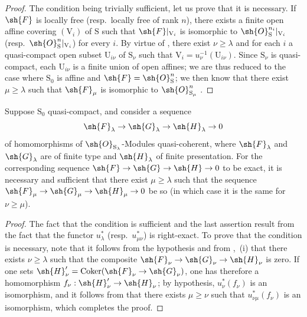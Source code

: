 \begin{proof}
The condition being trivially sufficient, let us prove that it is necessary.
If $\sh{F}$ is locally free (resp.\ locally free of rank $n$), there exists a finite open affine covering $(\mathrm{V}_i)$ of $\mathrm{S}$ such that $\sh{F}|_{\mathrm{V}_i}$ is isomorphic to $\sh{O}_\mathrm{S}^{n_i}|_{\mathrm{V}_i}$ (resp.\ $\sh{O}_\mathrm{S}^n|_{\mathrm{V}_i}$) for every $i$.
By virtue of , there exist $\nu\geqslant\lambda$ and for each $i$ a quasi-compact open subset $\mathrm{U}_{i\nu}$ of $\mathrm{S}_\nu$ such that $\mathrm{V}_i=u_\nu^{-1}(\mathrm{U}_{i\nu})$.
Since $\mathrm{S}_\nu$ is quasi-compact, each $\mathrm{U}_{i\nu}$ is a finite union of open affines; we are thus reduced to the case where $\mathrm{S}_0$ is affine and $\sh{F}=\sh{O}_\mathrm{S}^n$; we then know that there exist $\mu\geqslant\lambda$ such that $\sh{F}_\mu$ is isomorphic to $\sh{O}_{\mathrm{S}_\mu}^n$ .
\end{proof}

\begin{proposition}[8.5.6]
\label{IV.8.5.6}
Suppose $\mathrm{S}_0$ quasi-compact, and consider a sequence
\[
  \sh{F}_\lambda\to\sh{G}_\lambda\to\sh{H}_\lambda\to 0
\]
of homomorphisms of $\sh{O}_{\mathrm{S}_\lambda}$-Modules quasi-coherent, where $\sh{F}_\lambda$ and $\sh{G}_\lambda$ are of finite type and $\sh{H}_\lambda$ of finite presentation.
For the corresponding sequence $\sh{F}\to\sh{G}\to\sh{H}\to 0$ to be exact, it is necessary and sufficient that there exist $\mu\geqslant\lambda$ such that the sequence $\sh{F}_\mu\to\sh{G}_\mu\to\sh{H}_\mu\to 0$ be so (in which case it is the same for $\nu\geqslant\mu$).
\end{proposition}

\begin{proof}
The fact that the condition is sufficient and the last assertion result from the fact that the functor $u_\lambda^*$ (resp.\ $u_{\mu\nu}^*$) is right-exact.
To prove that the condition is necessary, note that it follows from the hypothesis and from ,~(i) that there exists $\nu\geqslant\lambda$ such that the composite $\sh{F}_\nu\to\sh{G}_\nu\to\sh{H}_\nu$ is zero.
If one sets $\sh{H}'_\nu=\operatorname{Coker}(\sh{F}_\nu\to\sh{G}_\nu)$, one has therefore a homomorphism $f_\nu:\sh{H}'_\nu\to\sh{H}_\nu$; by hypothesis, $u_\nu^*(f_\nu)$ is an isomorphism, and it follows from  that there exists $\mu\geqslant\nu$ such that $u_{\nu\mu}^*(f_\nu)$ is an isomorphism, which completes the proof.
\end{proof}

